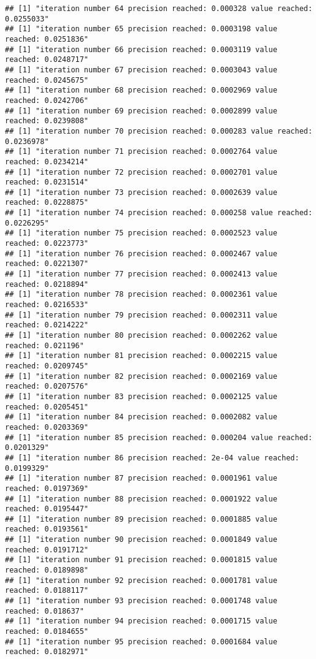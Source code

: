 \documentclass[
]{article}
\begin{document}
\begin{verbatim}
## [1] "iteration number 64 precision reached: 0.000328 value reached: 0.0255033"
## [1] "iteration number 65 precision reached: 0.0003198 value reached: 0.0251836"
## [1] "iteration number 66 precision reached: 0.0003119 value reached: 0.0248717"
## [1] "iteration number 67 precision reached: 0.0003043 value reached: 0.0245675"
## [1] "iteration number 68 precision reached: 0.0002969 value reached: 0.0242706"
## [1] "iteration number 69 precision reached: 0.0002899 value reached: 0.0239808"
## [1] "iteration number 70 precision reached: 0.000283 value reached: 0.0236978"
## [1] "iteration number 71 precision reached: 0.0002764 value reached: 0.0234214"
## [1] "iteration number 72 precision reached: 0.0002701 value reached: 0.0231514"
## [1] "iteration number 73 precision reached: 0.0002639 value reached: 0.0228875"
## [1] "iteration number 74 precision reached: 0.000258 value reached: 0.0226295"
## [1] "iteration number 75 precision reached: 0.0002523 value reached: 0.0223773"
## [1] "iteration number 76 precision reached: 0.0002467 value reached: 0.0221307"
## [1] "iteration number 77 precision reached: 0.0002413 value reached: 0.0218894"
## [1] "iteration number 78 precision reached: 0.0002361 value reached: 0.0216533"
## [1] "iteration number 79 precision reached: 0.0002311 value reached: 0.0214222"
## [1] "iteration number 80 precision reached: 0.0002262 value reached: 0.021196"
## [1] "iteration number 81 precision reached: 0.0002215 value reached: 0.0209745"
## [1] "iteration number 82 precision reached: 0.0002169 value reached: 0.0207576"
## [1] "iteration number 83 precision reached: 0.0002125 value reached: 0.0205451"
## [1] "iteration number 84 precision reached: 0.0002082 value reached: 0.0203369"
## [1] "iteration number 85 precision reached: 0.000204 value reached: 0.0201329"
## [1] "iteration number 86 precision reached: 2e-04 value reached: 0.0199329"
## [1] "iteration number 87 precision reached: 0.0001961 value reached: 0.0197369"
## [1] "iteration number 88 precision reached: 0.0001922 value reached: 0.0195447"
## [1] "iteration number 89 precision reached: 0.0001885 value reached: 0.0193561"
## [1] "iteration number 90 precision reached: 0.0001849 value reached: 0.0191712"
## [1] "iteration number 91 precision reached: 0.0001815 value reached: 0.0189898"
## [1] "iteration number 92 precision reached: 0.0001781 value reached: 0.0188117"
## [1] "iteration number 93 precision reached: 0.0001748 value reached: 0.018637"
## [1] "iteration number 94 precision reached: 0.0001715 value reached: 0.0184655"
## [1] "iteration number 95 precision reached: 0.0001684 value reached: 0.0182971"

\end{verbatim}
\end{document}
